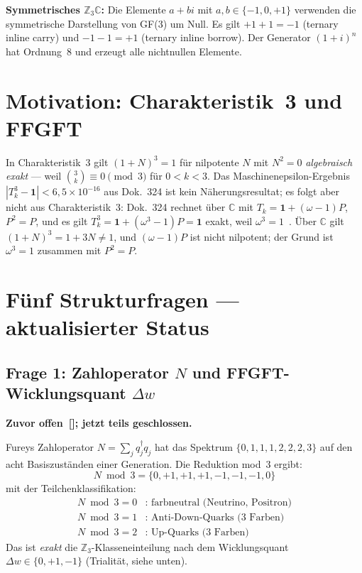 \vspace{0.5em}
\noindent
\textbf{Symmetrisches $\mathbb{Z}_3\mathbb{C}$:}
Die Elemente $a+bi$ mit $a,b\in\{-1,0,+1\}$ verwenden die symmetrische
Darstellung von GF(3) um Null. Es gilt $+1+1=-1$ (ternary inline carry)
und $-1-1=+1$ (ternary inline borrow). Der Generator $(1+i)^n$ hat
Ordnung~8 und erzeugt alle nichtnullen Elemente.

\section{Motivation: Charakteristik~3 und FFGFT}

In Charakteristik~3 gilt $(1+N)^3 = 1$ für nilpotente $N$ mit $N^2=0$
\emph{algebraisch exakt} — weil $\binom{3}{k}\equiv 0\pmod{3}$ für $0<k<3$.
Das Maschinenepsilon-Ergebnis $|T_k^3-\mathbf{1}|<6{,}5\times10^{-16}$ aus
Dok.~324 ist kein Näherungsresultat; es folgt aber nicht aus Charakteristik~3:
Dok.~324 rechnet über $\mathbb{C}$ mit $T_k = \mathbf{1} + (\omega-1)P$, $P^2 = P$,
und es gilt $T_k^3 = \mathbf{1} + (\omega^3-1)P = \mathbf{1}$ exakt, weil $\omega^3 = 1$~\BM. Über $\mathbb{C}$ gilt $(1+N)^3 = 1 + 3N \neq 1$, und $(\omega-1)P$ ist nicht nilpotent;
der Grund ist $\omega^3 = 1$ zusammen mit $P^2 = P$.

\section{Fünf Strukturfragen — aktualisierter Status}

\subsection{Frage 1: Zahloperator $N$ und FFGFT-Wicklungsquant $\Delta w$}

\textbf{Zuvor offen~[\SM]; jetzt teils geschlossen.}

Fureys Zahloperator $N = \sum_j q_j^\dagger q_j$ hat das Spektrum
$\{0,1,1,1,2,2,2,3\}$ auf den acht Basiszuständen einer Generation.
Die Reduktion mod~3 ergibt:
\begin{equation}
  N\bmod 3 = \{0,+1,+1,+1,-1,-1,-1,0\}
\end{equation}
mit der Teilchenklassifikation:
\begin{align*}
  N\bmod 3 = 0&: \text{ farbneutral (Neutrino, Positron)} \\
  N\bmod 3 = 1&: \text{ Anti-Down-Quarks (3 Farben)} \\
  N\bmod 3 = 2&: \text{ Up-Quarks (3 Farben)}
\end{align*}
Das ist \emph{exakt} die $\mathbb{Z}_3$-Klasseneinteilung nach dem
Wicklungsquant $\Delta w\in\{0,+1,-1\}$ (Trialität, siehe unten).

